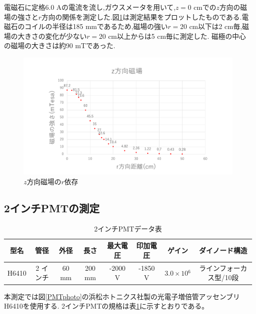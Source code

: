 \newpage
電磁石に定格6.0 Aの電流を流し,ガウスメータを用いて,$z=0$ cmでの$z$方向の磁場の強さと$r$方向の関係を測定した.図\ref{maggraph01}は測定結果をプロットしたものである.電磁石のコイルの半径は185 mmであるため,磁場の強い$r=20$ cm以下は2 cm毎,磁場の大きさの変化が少ない$r=20$ cm以上からは5 cm毎に測定した.
磁極の中心の磁場の大きさは約90 mTであった.
\begin{figure}[tbp]
	\centering
	\includegraphics[width=15cm]{fig/iguchi/maggraph01.pdf}
	\caption{$z$方向磁場の$r$依存}
	\label{maggraph01}
\end{figure}


\subsection{2インチPMTの測定}\label{noFe}

\begin{table}[tbp]
	\centering
	 \begin{tabular}{cccccccc}\hline
	型名& 管径 & 外径 & 長さ & 最大電圧 & 印加電圧 & ゲイン & ダイノード構造 \\ \hline \hline
	H6410 & 2 インチ & 60 mm & 200 mm & -2000 V & -1850 V & $3.0\times10{^{6}}$ &ラインフォーカス型/10段 \\ \hline
	\end{tabular}
	  \caption{2インチPMTデータ表}
	  \label{PMTdata}
\end{table}

本測定では図\ref{PMTphoto}の浜松ホトニクス社製の光電子増倍管アッセンブリH6410\cite{pmtH6410}を使用する.
2インチPMTの規格は表\ref{PMTdata}に示すとおりである。

